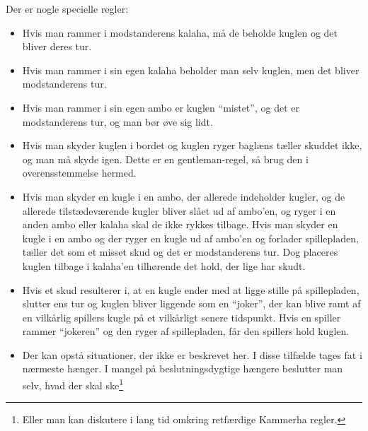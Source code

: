 Der er nogle specielle regler: 
\begin{itemize}
    \item Hvis man rammer i modstanderens kalaha, må de beholde kuglen og det bliver deres tur. 
    \item Hvis man rammer i sin egen kalaha beholder man selv kuglen, men det bliver modstanderens tur.
    \item Hvis man rammer i sin egen ambo er kuglen ``mistet'', og det er modstanderens tur, og man bør øve sig lidt.
    \item Hvis man skyder kuglen i bordet og kuglen ryger baglæns tæller skuddet ikke, og man må skyde igen. Dette er en gentleman-regel, så brug den i overensstemmelse hermed.
    \item Hvis man skyder en kugle i en ambo, der allerede indeholder kugler, og de allerede tilstædeværende kugler bliver slået ud af ambo'en, og ryger i en anden ambo eller kalaha skal de ikke rykkes tilbage. Hvis man skyder en kugle i en ambo og der ryger en kugle ud af ambo'en og forlader spillepladen, tæller det som et misset skud og det er modstanderens tur. Dog placeres kuglen tilbage i kalaha'en tilhørende det hold, der lige har skudt.
    \item Hvis et skud resulterer i, at en kugle ender med at ligge stille på spillepladen, slutter ens tur og kuglen bliver liggende som en ``joker'', der kan blive ramt af en vilkårlig spillers kugle på et vilkårligt senere tidspunkt. Hvis en spiller rammer ``jokeren'' og den ryger af spillepladen, får den spillers hold kuglen.
    \item Der kan opstå situationer, der ikke er beskrevet her. I disse tilfælde tages fat i nærmeste hænger. I mangel på beslutningsdygtige hængere beslutter man selv, hvad der skal ske\footnote{Eller man kan diskutere i lang tid omkring retfærdige Kammerha regler.}
\end{itemize}

